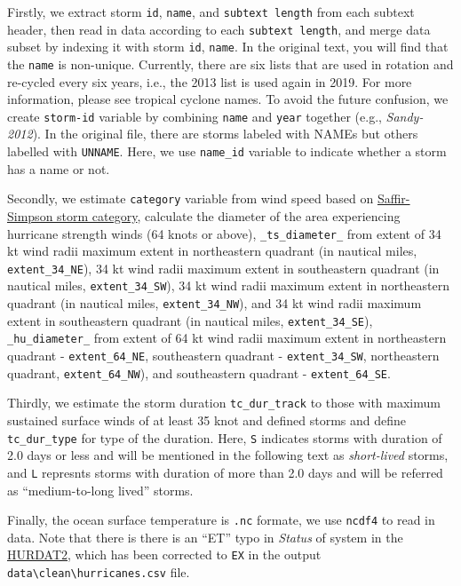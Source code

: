 \documentclass[]{book}
\begin{document}
Firstly, we extract storm \texttt{id}, \texttt{name}, and \texttt{subtext\ length} from each subtext header, then read in data according to each \texttt{subtext\ length}, and merge data subset by indexing it with storm \texttt{id}, \texttt{name}. In the original text, you will find that the \texttt{name} is non-unique. Currently, there are six lists that are used in rotation and re-cycled every six years, i.e., the 2013 list is used again in 2019. For more information, please see tropical cyclone names. To avoid the future confusion, we create \texttt{storm-id} variable by combining \texttt{name} and \texttt{year} together (e.g., \emph{Sandy-2012}). In the original file, there are storms labeled with NAMEs but others labelled with \texttt{UNNAME}. Here, we use \texttt{name\_id} variable to indicate whether a storm has a name or not.

Secondly, we estimate \texttt{category} variable from wind speed based on \href{https://www.nhc.noaa.gov/aboutsshws.php}{Saffir-Simpson storm category}, calculate the diameter of the area experiencing hurricane strength winds (64 knots or above), \texttt{\_ts\_diameter\_} from extent of 34 kt wind radii maximum extent in northeastern quadrant (in nautical miles, \texttt{extent\_34\_NE}), 34 kt wind radii maximum extent in southeastern quadrant (in nautical miles, \texttt{extent\_34\_SW}), 34 kt wind radii maximum extent in northeastern quadrant (in nautical miles, \texttt{extent\_34\_NW}), and 34 kt wind radii maximum extent in southeastern quadrant (in nautical miles, \texttt{extent\_34\_SE}), \texttt{\_hu\_diameter\_} from extent of 64 kt wind radii maximum extent in northeastern quadrant - \texttt{extent\_64\_NE}, southeastern quadrant - \texttt{extent\_34\_SW}, northeastern quadrant, \texttt{extent\_64\_NW}), and southeastern quadrant - \texttt{extent\_64\_SE}.

Thirdly, we estimate the storm duration \texttt{tc\_dur\_track} to those with maximum sustained surface winds of at least 35 knot and defined storms and define \texttt{tc\_dur\_type} for type of the duration. Here, \texttt{S} indicates storms with duration of 2.0 days or less and will be mentioned in the following text as \emph{short-lived} storms, and \texttt{L} represnts storms with duration of more than 2.0 days and will be referred as ``medium-to-long lived'' storms.

Finally, the ocean surface temperature is \texttt{.nc} formate, we use \texttt{ncdf4} to read in data. Note that there is there is an ``ET'' typo in \emph{Status} of system in the \href{https://www.nhc.noaa.gov/data/hurdat/hurdat2-1851-2018-120319.txt}{HURDAT2}, which has been corrected to \texttt{EX} in the output \texttt{data\textbackslash{}clean\textbackslash{}hurricanes.csv} file.
\end{document}
